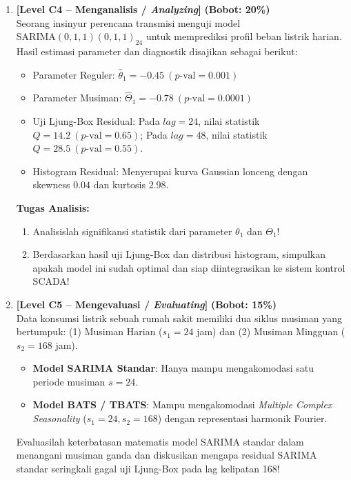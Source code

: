 \documentclass[11pt,a4paper]{article}
\begin{document}
\begin{enumerate}[leftmargin=1.5em, label=\textbf{Soal \arabic*.}]
    \newpage

    \item \textbf{[Level C4 -- Menganalisis / \textit{Analyzing}]} \hfill \textbf{(Bobot: 20\%)} \\
    Seorang insinyur perencana transmisi menguji model $\text{SARIMA}(0,1,1)(0,1,1)_{24}$ untuk memprediksi profil beban listrik harian. Hasil estimasi parameter dan diagnostik disajikan sebagai berikut:
    \begin{itemize}
        \item Parameter Reguler: $\hat{\theta}_1 = -0.45 \ (p\text{-val} = 0.001)$
        \item Parameter Musiman: $\hat{\Theta}_1 = -0.78 \ (p\text{-val} = 0.0001)$
        \item Uji Ljung-Box Residual: Pada $lag = 24$, nilai statistik $Q = 14.2 \ (p\text{-val} = 0.65)$; Pada $lag = 48$, nilai statistik $Q = 28.5 \ (p\text{-val} = 0.55)$.
        \item Histogram Residual: Menyerupai kurva Gaussian lonceng dengan skewness $0.04$ dan kurtosis $2.98$.
    \end{itemize}
    \textbf{Tugas Analisis:}
    \begin{enumerate}[label=\alph*.]
        \item Analisislah signifikansi statistik dari parameter $\theta_1$ dan $\Theta_1$!
        \item Berdasarkan hasil uji Ljung-Box dan distribusi histogram, simpulkan apakah model ini sudah optimal dan siap diintegrasikan ke sistem kontrol SCADA!
    \end{enumerate}

    \vspace{0.4cm}

    \item \textbf{[Level C5 -- Mengevaluasi / \textit{Evaluating}]} \hfill \textbf{(Bobot: 15\%)} \\
    Data konsumsi listrik sebuah rumah sakit memiliki dua siklus musiman yang bertumpuk: (1) Musiman Harian ($s_1 = 24$ jam) dan (2) Musiman Mingguan ($s_2 = 168$ jam).
    \begin{itemize}
        \item \textbf{Model SARIMA Standar}: Hanya mampu mengakomodasi satu periode musiman $s=24$.
        \item \textbf{Model BATS / TBATS}: Mampu mengakomodasi \textit{Multiple Complex Seasonality} ($s_1=24, s_2=168$) dengan representasi harmonik Fourier.
    \end{itemize}
    Evaluasilah keterbatasan matematis model SARIMA standar dalam menangani musiman ganda dan diskusikan mengapa residual SARIMA standar seringkali gagal uji Ljung-Box pada lag kelipatan 168!


\end{enumerate}
\end{document}
